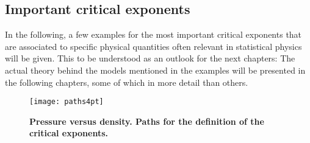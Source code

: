 \subsection{Important critical exponents}

In the following, a few examples for the most important critical exponents that are associated to specific physical quantities often relevant in statistical physics will be given. This to be understood as an outlook for the next chapters: The actual theory behind the models mentioned in the examples will be presented in the following chapters, some of which in more detail than others.

\begin{figure}[htbp]
\begin{center}
\texttt{[image: paths4pt]}
\caption{{\bf Pressure versus density. Paths for the definition of the critical exponents.}}
\end{center}
\end{figure}



